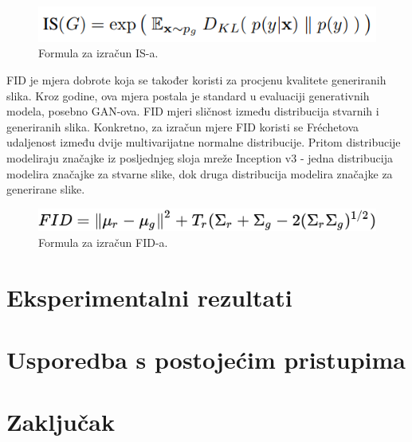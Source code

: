 \documentclass[conference]{IEEEtran}
\begin{document}
\begin{figure}[H]
    \centering
    \includegraphics[width=0.9\linewidth]{imgs/IS_formula.png}
    \caption{Formula za izračun IS-a.}
    \label{fig:is_formula}
\end{figure}

FID\cite{heusel2017gans} je mjera dobrote koja se također koristi za procjenu kvalitete generiranih slika. Kroz godine, ova mjera postala je standard u evaluaciji generativnih modela, posebno GAN-ova. FID mjeri sličnost između distribucija stvarnih i generiranih slika. Konkretno, za izračun mjere FID koristi se Fréchetova udaljenost između dvije multivarijatne normalne distribucije. Pritom distribucije modeliraju značajke iz posljednjeg sloja mreže Inception v3 - jedna distribucija modelira značajke za stvarne slike, dok druga distribucija modelira značajke za generirane slike.

\begin{figure}[H]
    \centering
    \includegraphics[width=0.9\linewidth]{imgs/FID_formula.png}
    \caption{Formula za izračun FID-a.}
    \label{fig:fid_formula}
\end{figure}

\section{Eksperimentalni rezultati}


\section{Usporedba s postojećim pristupima}


\section{Zaključak}


	
	
        \nocite{*}
\end{document}

